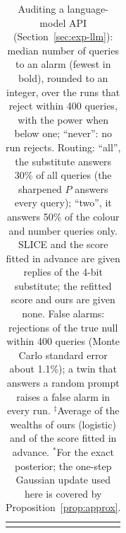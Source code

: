 \documentclass[pdflatex,sn-mathphys-ay]{sn-jnl}
\theoremstyle{thmstyleone}
\theoremstyle{thmstyletwo}
\begin{document}
\begin{table}[t]
\centering
\caption{Auditing a language-model API (Section~\ref{sec:exp-llm}): median
number of queries to an alarm (fewest in bold), rounded to an integer, over
the runs that reject within 400 queries, with the power when below one;
``never'': no run rejects. Routing: ``all'', the substitute answers 30\% of
all queries (the sharpened $P$ answers every query); ``two'', it answers 50\%
of the colour and number queries only. SLICE and the score fitted in advance
are given replies of the 4-bit substitute; the refitted score and ours are
given none. False alarms: rejections of the true null within 400 queries
(Monte Carlo standard error about 1.1\%); a twin that answers a random prompt
raises a false alarm in every run. $^\ddagger$Average of the wealths of ours
(logistic) and of the score fitted in advance. $^*$For the exact posterior;
the one-step Gaussian update used here is covered by
Proposition~\ref{prop:approx}.}
\label{tab:llm}
\small
\setlength{\tabcolsep}{4pt}
\begin{tabular}{@{}c@{}}\resizebox{\textwidth}{!}{\usebox{\widetab}}\end{tabular}
\end{table}
\end{document}
